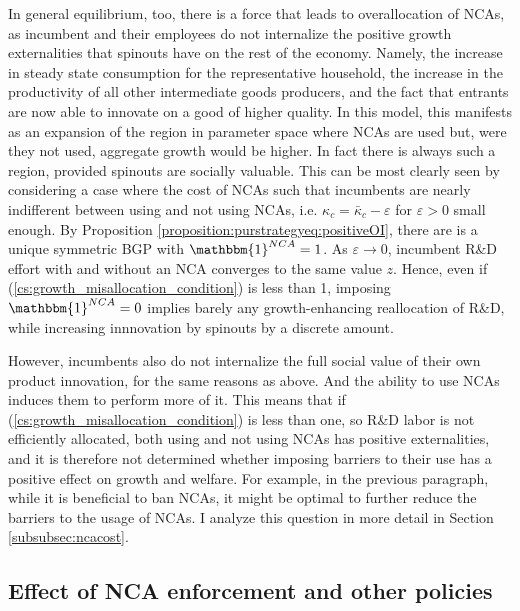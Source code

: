 \documentclass[11pt,english]{article}
\begin{document}
In general equilibrium, too, there is a force that leads to overallocation of NCAs, as incumbent and their employees do not internalize the positive growth externalities that spinouts have on the rest of the economy. Namely, the increase in steady state consumption for the representative household, the increase in the productivity of all other intermediate goods producers, and the fact that entrants are now able to innovate on a good of higher quality. In this model, this manifests as an expansion of the region in parameter space where NCAs are used but, were they not used, aggregate growth would be higher. In fact there is always such a region, provided spinouts are socially valuable. This can be most clearly seen by considering a case where the cost of NCAs such that incumbents are nearly indifferent between using and not using NCAs, i.e. $\kappa_c = \bar{\kappa}_c - \varepsilon$ for $\varepsilon > 0$ small enough. By Proposition \ref{proposition:purstrategyeq:positiveOI}, there are is a unique symmetric BGP with $\mathbbm{1}^{NCA} = 1$. As $\varepsilon \to 0$, incumbent R\&D effort with and without an NCA converges to the same value $z$. Hence, even if (\ref{cs:growth_misallocation_condition}) is less than 1, imposing $\mathbbm{1}^{NCA} = 0$ implies barely any growth-enhancing reallocation of R\&D, while increasing innnovation by spinouts by a discrete amount. 

However, incumbents also do not internalize the full social value of their own product innovation, for the same reasons as above. And the ability to use NCAs induces them to perform more of it. This means that if (\ref{cs:growth_misallocation_condition}) is less than one, so R\&D labor is not efficiently allocated, both using and not using NCAs has positive externalities, and it is therefore not determined whether imposing barriers to their use has a positive effect on growth and welfare. For example, in the previous paragraph, while it is beneficial to ban NCAs, it might be optimal to further reduce the barriers to the usage of NCAs. I analyze this question in more detail in Section \ref{subsubsec:ncacost}. 

\subsection{Effect of NCA enforcement and other policies}\label{model:efficiency:policy_analysis}
\end{document}
